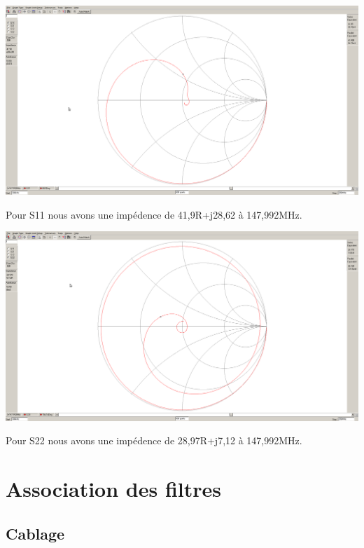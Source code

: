 \documentclass[a4paper,12pt]{report}            %
\begin{document}
\begin{center}\includegraphics[scale = 0.25]{pic/abaque_phs11.png}\\ \end{center}
Pour S11 nous avons une impédence de 41,9R+j28,62 à 147,992MHz.

\begin{center}\includegraphics[scale = 0.25]{pic/abaque_phs22.png}\\ \end{center}
Pour S22 nous avons une impédence de 28,97R+j7,12 à 147,992MHz.

\chapter{Association des filtres}

\section{Cablage}
\end{document}
